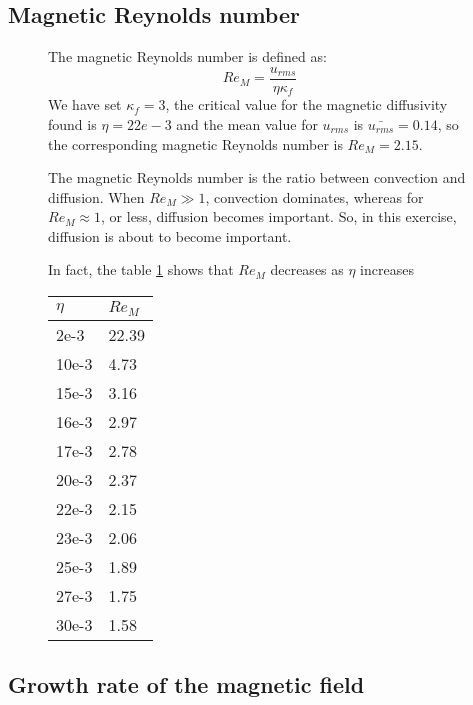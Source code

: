 \subsection{Magnetic Reynolds number}
\begin{figure}[h]
\begin{minipage}{.70\textwidth}
The magnetic Reynolds number is defined as:
\begin{equation}
 Re_M = \frac{u_{rms}}{\eta \kappa_f}
\end{equation}
We have set $\kappa_f = 3$, the critical value for the magnetic diffusivity found is  $\eta = 22e-3$ and the mean value for $u_{rms}$ is $\bar{u_{rms}} = 0.14$, so the corresponding magnetic Reynolds number is $Re_M = 2.15$.

The magnetic Reynolds number is the ratio between convection and diffusion. When $Re_M \gg 1$, convection dominates, whereas for $Re_M \approx 1$, or less, diffusion becomes important. So, in this exercise, diffusion is about to become important.

In fact, the table \ref{tab:re}  shows that $Re_M$ decreases as $\eta$ increases
 \end{minipage}
\hspace{0.5cm}
\begin{minipage}{.30\textwidth}
\begin{center}
\begin{tabular}{ll}
$\eta$ & $Re_M$\\\hline
2e-3 & 22.39\\
10e-3 & 4.73\\
15e-3 & 3.16\\
16e-3 & 2.97\\
17e-3 & 2.78\\
20e-3 & 2.37\\
22e-3 & 2.15\\
23e-3 & 2.06\\
25e-3 & 1.89\\
27e-3 & 1.75\\
30e-3 & 1.58\\
\end{tabular}
\label{tab:re}
\end{center}
\end{minipage}
\end{figure}



\subsection{Growth rate of the magnetic field}

